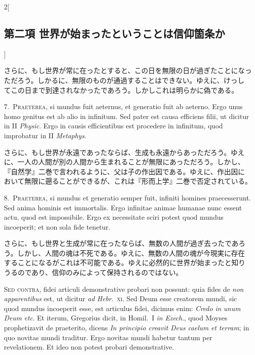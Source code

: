 \documentclass[paper=a4paper,fontsize=10pt,jafontsize=9pt,titlepage]{jlreq}
\begin{document}
\begin{paracol}{2}[\subsection{第二項 世界が始まったということは信仰箇条か}]
\switchcolumn


さらに、もし世界が常に在ったとすると、この日を無限の日が過ぎたことになっ
ただろう。しかるに、無限のものが通過することはできない。ゆえに、けっし
てこの日まで到達されなかったであろう。しかしこれは明らかに偽である。




7.~{\scshape Praeterea}, si mundus fuit aeternus, et generatio fuit ab
 aeterno. Ergo unus homo genitus est ab alio in infinitum. Sed pater est
 causa efficiens filii, ut dicitur in II {\itshape Physic}. Ergo in causis
 efficientibus est procedere in infinitum, quod improbatur in II
 {\itshape Metaphys}.


\switchcolumn


さらに、もし世界が永遠であったならば、生成も永遠からあっただろう。ゆえ
に、一人の人間が別の人間から生まれることが無限にあっただろう。しかし、
『自然学』二巻で言われるように、父は子の作出因である。ゆえに、作出因に
おいて無限に遡ることができるが、これは『形而上学』二巻で否定されている。




8.~{\scshape Praeterea}, si mundus et generatio semper fuit, infiniti homines
 praecesserunt. Sed anima hominis est immortalis. Ergo infinitae animae
 humanae nunc essent actu, quod est impossibile. Ergo ex necessitate
 sciri potest quod mundus incoeperit; et non sola fide tenetur.


\switchcolumn


さらに、もし世界と生成が常に在ったならば、無数の人間が過ぎ去ったであろ
う。しかし、人間の魂は不死である。ゆえに、無数の人間の魂が今現実に存在
することになるがこれは不可能である。ゆえに必然的に世界が始まったと知り
うるのであり、信仰のみによって保持されるのではない。


\switchcolumn*[\subsection{s.c.}]


{\scshape Sed contra}, fidei articuli demonstrative probari non possunt: quia
 fides de {\itshape non apparentibus} est, ut dicitur {\itshape ad Hebr}.~{\scshape xi}. Sed Deum esse
 creatorem mundi, sic quod mundus incoeperit esse, est articulus fidei,
 dicimus enim: {\itshape Credo in unum Deum etc}. Et iterum, Gregorius dicit,
 in Homil.~I {\itshape in Ezech}., quod Moyses prophetizavit de praeterito, dicens
 {\itshape In principio creavit Deus caelum et terram}; in quo novitas mundi
 traditur. Ergo novitas mundi habetur tantum per revelationem. Et ideo
 non potest probari demonstrative.



\end{paracol}
\end{document}
